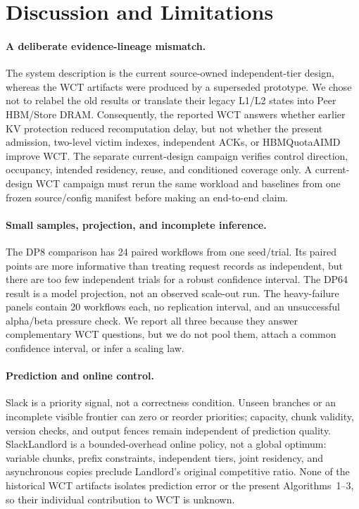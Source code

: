 \section{Discussion and Limitations}
\label{sec:discussion}

\paragraph{A deliberate evidence-lineage mismatch.}
The system description is the current source-owned independent-tier design,
whereas the WCT artifacts were produced by a superseded prototype.  We chose
not to relabel the old results or translate their legacy L1/L2 states into
Peer HBM/Store DRAM.  Consequently, the reported WCT answers whether earlier
KV protection reduced recomputation delay, but not whether the present
admission, two-level victim indexes, independent ACKs, or HBMQuotaAIMD improve
WCT.  The separate current-design campaign verifies control direction,
occupancy, intended residency, reuse, and conditioned coverage only.  A
current-design WCT campaign must rerun the same workload and baselines from
one frozen source/config manifest before making an end-to-end claim.

\paragraph{Small samples, projection, and incomplete inference.}
The DP8 comparison has 24 paired workflows from one seed/trial.  Its paired
points are more informative than treating request records as independent, but
there are too few independent trials for a robust confidence interval.  The
DP64 result is a model projection, not an observed scale-out run.  The
heavy-failure panels contain 20 workflows each, no replication interval, and
an unsuccessful alpha/beta pressure check.  We report all three because they
answer complementary WCT questions, but we do not pool them, attach a common
confidence interval, or infer a scaling law.

\paragraph{Prediction and online control.}
Slack is a priority signal, not a correctness condition.  Unseen branches or
an incomplete visible frontier can zero or reorder priorities; capacity,
chunk validity, version checks, and output fences remain independent of
prediction quality.  SlackLandlord is a bounded-overhead online policy, not a
global optimum: variable chunks, prefix constraints, independent tiers,
joint residency, and asynchronous copies preclude Landlord's original
competitive ratio.  None of the historical WCT artifacts isolates prediction
error or the present Algorithms~1--3, so their individual contribution to WCT
is unknown.

